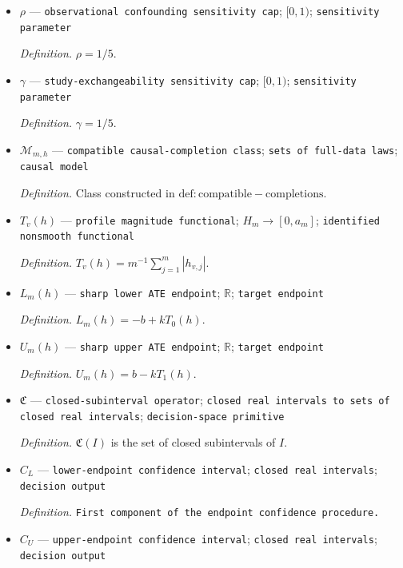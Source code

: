 \documentclass{article}
\begin{document}
\begin{itemize}
  \par\smallskip\noindent\emph{Definition.} Marginal law of \(O_i\) induced by \(Q\).
  \item \(\rho\) --- \texttt{observational confounding sensitivity cap}; \([0,1)\); \texttt{sensitivity parameter}
  \par\smallskip\noindent\emph{Definition.} \(\rho=1/5\).
  \item \(\gamma\) --- \texttt{study-\allowbreak{}exchangeability sensitivity cap}; \([0,1)\); \texttt{sensitivity parameter}
  \par\smallskip\noindent\emph{Definition.} \(\gamma=1/5\).
  \item \(\mathcal M_{m,h}\) --- \texttt{compatible causal-\allowbreak{}completion class}; \texttt{sets of full-\allowbreak{}data laws}; \texttt{causal model}
  \par\smallskip\noindent\emph{Definition.} Class constructed in \(\mathrm{def:compatible-completions}\).
  \item \(T_v(h)\) --- \texttt{profile magnitude functional}; \(H_m\to[0,a_m]\); \texttt{identified nonsmooth functional}
  \par\smallskip\noindent\emph{Definition.} \(T_v(h)=m^{-1}\sum_{j=1}^{m}|h_{v,j}|\).
  \item \(L_m(h)\) --- \texttt{sharp lower ATE endpoint}; \(\mathbb R\); \texttt{target endpoint}
  \par\smallskip\noindent\emph{Definition.} \(L_m(h)=-b+kT_0(h)\).
  \item \(U_m(h)\) --- \texttt{sharp upper ATE endpoint}; \(\mathbb R\); \texttt{target endpoint}
  \par\smallskip\noindent\emph{Definition.} \(U_m(h)=b-kT_1(h)\).
  \item \(\mathfrak C\) --- \texttt{closed-\allowbreak{}subinterval operator}; \texttt{closed real intervals to sets of closed real intervals}; \texttt{decision-\allowbreak{}space primitive}
  \par\smallskip\noindent\emph{Definition.} \(\mathfrak C(I)\) is the set of closed subintervals of \(I\).
  \item \(C_L\) --- \texttt{lower-\allowbreak{}endpoint confidence interval}; \texttt{closed real intervals}; \texttt{decision output}
  \par\smallskip\noindent\emph{Definition.} \texttt{First component of the endpoint confidence procedure.}
  \item \(C_U\) --- \texttt{upper-\allowbreak{}endpoint confidence interval}; \texttt{closed real intervals}; \texttt{decision output}

\end{itemize}
\end{document}
